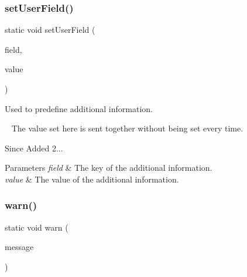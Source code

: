 \subsubsection{\texorpdfstring{set\+User\+Field()}{setUserField()}}
{\footnotesize\ttfamily static void set\+User\+Field (\begin{DoxyParamCaption}\item[{@Non\+Null final String}]{field,  }\item[{@Non\+Null final Object}]{value }\end{DoxyParamCaption})\hspace{0.3cm}{\ttfamily [static]}}



Used to predefine additional information. 

~\newline
 The value set here is sent together without being set every time.

\begin{DoxySince}{Since}
Added 2... 
\end{DoxySince}

\begin{DoxyParams}{Parameters}
{\em field} & The key of the additional information. \\
\hline
{\em value} & The value of the additional information. \\
\hline
\end{DoxyParams}
\mbox{\label{classcom_1_1toast_1_1android_1_1gamebase_1_1_gamebase_1_1_logger_ad6acf6b0724d6133534ddd54cc4f1b42}} 
\subsubsection{\texorpdfstring{warn()}{warn()}\hspace{0.1cm}{\footnotesize\ttfamily [1/3]}}
{\footnotesize\ttfamily static void warn (\begin{DoxyParamCaption}\item[{@Non\+Null final String}]{message }\end{DoxyParamCaption})\hspace{0.3cm}{\ttfamily [static]}}



